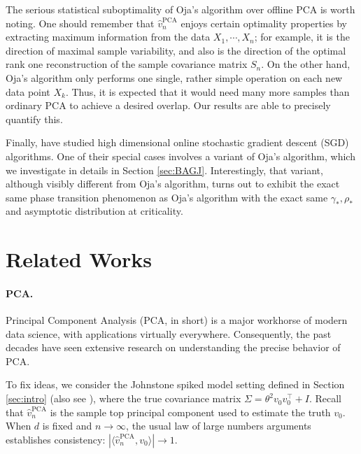 \documentclass[12pt]{article}
\newcommand{\PCA}{\text{PCA}}
\begin{document}
 \medskip

The serious statistical suboptimality of Oja's algorithm over offline PCA is worth noting. One should remember that $\hat v_n^\PCA$ enjoys certain optimality properties by extracting maximum information from the data $X_1,\cdots, X_n$; for example, it is the direction of maximal sample variability, and also is the direction of the optimal rank one reconstruction of the sample covariance matrix $S_n$. On the other hand, Oja's algorithm only performs one single, rather simple operation on each new data point $X_k$. Thus, it is expected that it would need many more samples than ordinary PCA to achieve a desired overlap. Our results are able to precisely quantify this.

 \medskip

Finally, \citet{arous2021online} have studied high dimensional online stochastic gradient descent (SGD) algorithms. One of their special cases involves a variant of Oja's algorithm, which we investigate in details in Section \ref{sec:BAGJ}. Interestingly, that variant, although visibly different from Oja's algorithm, turns out to exhibit the exact same phase transition phenomenon as Oja's algorithm with the exact same $\gamma_*,\rho_*$ and asymptotic distribution at criticality.
\section{Related Works}\label{sec:related_works}

\paragraph{PCA.} Principal Component Analysis (PCA, in short) is a major workhorse of modern data science, with applications virtually everywhere. Consequently, the past decades have seen extensive research on understanding the precise behavior of PCA.

To fix ideas, we consider the Johnstone spiked model setting defined in Section \ref{sec:intro} (also see \citet{johnstone2001distribution}), where the true covariance matrix $\Sigma=\theta^2v_0v_0^\top+I$. Recall that $\hat v_n^\PCA$ is the sample top principal component used to estimate the truth $v_0$. When $d$ is fixed and $n\to\infty$, the usual law of large numbers arguments establishes consistency: $|\langle \hat v_n^\PCA,v_0\rangle|\to 1$.
\end{document}
